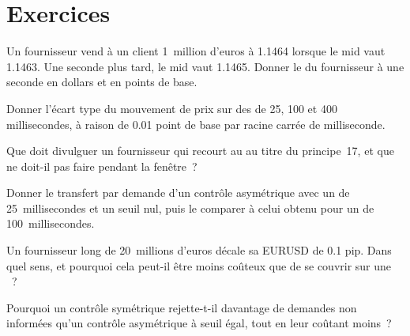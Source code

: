 \section{Exercices}

\begin{exercise}[$\star$]\label{exo:m2:fx-spot-microstructure:1}
Un fournisseur vend à un client 1~million d'euros à 1.1464 lorsque le mid vaut 1.1463. Une
seconde plus tard, le mid vaut 1.1465. Donner le  du fournisseur à une seconde en
dollars et en points de base.
\end{exercise}

\begin{exercise}[$\star$]\label{exo:m2:fx-spot-microstructure:2}
Donner l'écart type du mouvement de prix sur des  de 25, 100 et 400
millisecondes, à raison de 0.01 point de base par racine carrée de milliseconde.
\end{exercise}

\begin{exercise}[$\star$]\label{exo:m2:fx-spot-microstructure:3}
Que doit divulguer un fournisseur qui recourt au  au titre du principe~17, et que
ne doit-il pas faire pendant la fenêtre~?
\end{exercise}

\begin{exercise}[$\star\star$]\label{exo:m2:fx-spot-microstructure:4}
Donner le transfert par demande d'un contrôle asymétrique avec un  de 25~millisecondes
et un seuil nul, puis le comparer à celui obtenu pour un  de 100~millisecondes.
\end{exercise}

\begin{exercise}[$\star\star$]\label{exo:m2:fx-spot-microstructure:5}
Un fournisseur long de 20~millions d'euros décale sa  EURUSD de 0.1 pip. Dans quel sens,
et pourquoi cela peut-il être moins coûteux que de se couvrir sur une ~?
\end{exercise}

\begin{exercise}[$\star\star$]\label{exo:m2:fx-spot-microstructure:6}
Pourquoi un contrôle symétrique rejette-t-il davantage de demandes non informées qu'un
contrôle asymétrique à seuil égal, tout en leur coûtant moins~?
\end{exercise}

